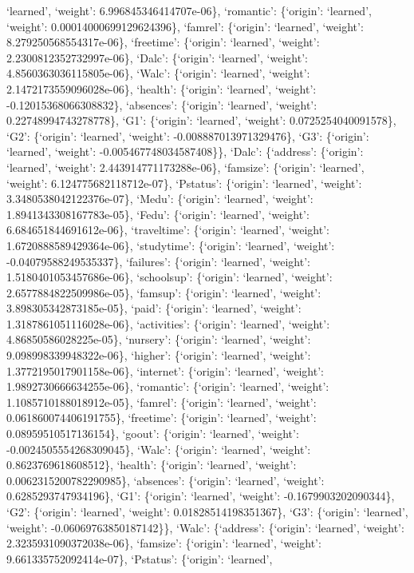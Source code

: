 \documentclass[
]{article}
\begin{document}
`learned', `weight': 6.996845346414707e-06\}, `romantic': \{`origin':
`learned', `weight': 0.00014000699129624396\}, `famrel': \{`origin':
`learned', `weight': 8.279250568554317e-06\}, `freetime': \{`origin':
`learned', `weight': 2.2300812352732997e-06\}, `Dalc': \{`origin':
`learned', `weight': 4.8560363036115805e-06\}, `Walc': \{`origin':
`learned', `weight': 2.1472173559096028e-06\}, `health': \{`origin':
`learned', `weight': -0.12015368066308832\}, `absences': \{`origin':
`learned', `weight': 0.22748994743278778\}, `G1': \{`origin': `learned',
`weight': 0.0725254040091578\}, `G2': \{`origin': `learned', `weight':
-0.008887013971329476\}, `G3': \{`origin': `learned', `weight':
-0.005467748034587408\}\}, `Dalc': \{`address': \{`origin': `learned',
`weight': 2.443914771173288e-06\}, `famsize': \{`origin': `learned',
`weight': 6.124775682118712e-07\}, `Pstatus': \{`origin': `learned',
`weight': 3.3480538042122376e-07\}, `Medu': \{`origin': `learned',
`weight': 1.8941343308167783e-05\}, `Fedu': \{`origin': `learned',
`weight': 6.684651844691612e-06\}, `traveltime': \{`origin': `learned',
`weight': 1.6720888589429364e-06\}, `studytime': \{`origin': `learned',
`weight': -0.04079588249535337\}, `failures': \{`origin': `learned',
`weight': 1.5180401053457686e-06\}, `schoolsup': \{`origin': `learned',
`weight': 2.6577884822509986e-05\}, `famsup': \{`origin': `learned',
`weight': 3.898305342873185e-05\}, `paid': \{`origin': `learned',
`weight': 1.3187861051116028e-06\}, `activities': \{`origin': `learned',
`weight': 4.86850586028225e-05\}, `nursery': \{`origin': `learned',
`weight': 9.098998339948322e-06\}, `higher': \{`origin': `learned',
`weight': 1.3772195017901158e-06\}, `internet': \{`origin': `learned',
`weight': 1.9892730666634255e-06\}, `romantic': \{`origin': `learned',
`weight': 1.1085710188018912e-05\}, `famrel': \{`origin': `learned',
`weight': 0.061860074406191755\}, `freetime': \{`origin': `learned',
`weight': 0.08959510517136154\}, `goout': \{`origin': `learned',
`weight': -0.0024505554268309045\}, `Walc': \{`origin': `learned',
`weight': 0.8623769618608512\}, `health': \{`origin': `learned',
`weight': 0.0062315200782290985\}, `absences': \{`origin': `learned',
`weight': 0.6285293747934196\}, `G1': \{`origin': `learned', `weight':
-0.1679903202090344\}, `G2': \{`origin': `learned', `weight':
0.01828514198351367\}, `G3': \{`origin': `learned', `weight':
-0.06069763850187142\}\}, `Walc': \{`address': \{`origin': `learned',
`weight': 2.3235931090372038e-06\}, `famsize': \{`origin': `learned',
`weight': 9.661335752092414e-07\}, `Pstatus': \{`origin': `learned',
\end{document}

